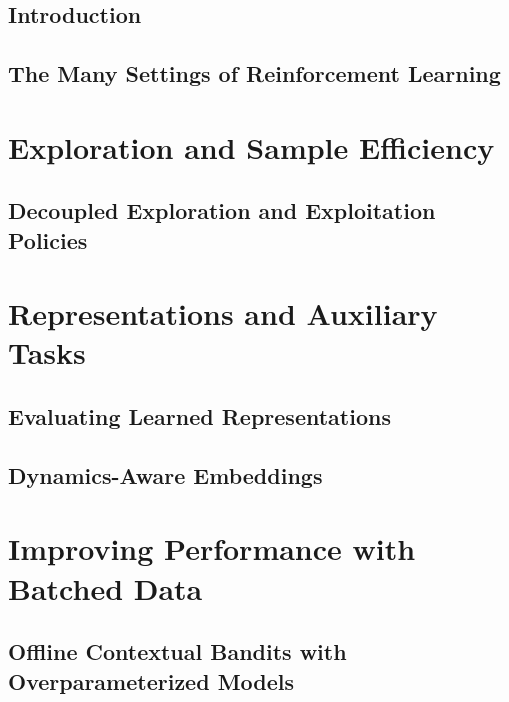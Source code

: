 
\chapter{Introduction} \label{sec:introduction}




\chapter{The Many Settings of Reinforcement Learning} \label{sec:rl-settings}



\part{Exploration and Sample Efficiency} \label{sec:exploration}
\chapter{Decoupled Exploration and Exploitation Policies} \label{sec:deep}

\part{Representations and Auxiliary Tasks} \label{sec:representation}
\chapter{Evaluating Learned Representations} \label{sec:representation-eval} 
\chapter{Dynamics-Aware Embeddings} \label{sec:dyne}

\part{Improving Performance with Batched Data} \label{sec:offline}
\chapter{Offline Contextual Bandits with Overparameterized Models} \label{sec:offline-bandits}
